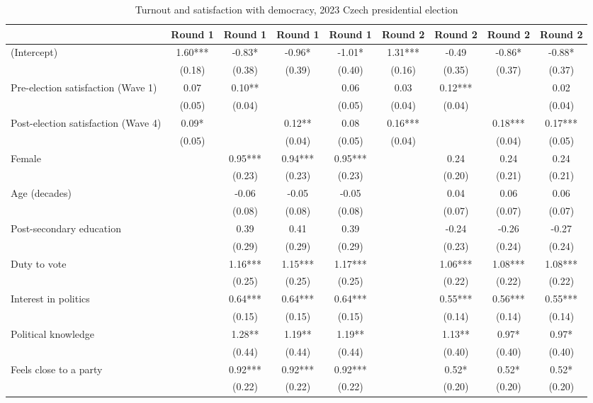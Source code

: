 \begin{table}

\caption{Turnout and satisfaction with democracy, 2023 Czech presidential election}
\centering
\begin{tabular}[t]{lcccccccc}
\toprule
  & Round 1 & Round 1  & Round 1   & Round 1    & Round 2 & Round 2  & Round 2   & Round 2   \\
\midrule
(Intercept) & 1.60*** & -0.83* & -0.96* & -1.01* & 1.31*** & -0.49 & -0.86* & -0.88*\\
 & (0.18) & (0.38) & (0.39) & (0.40) & (0.16) & (0.35) & (0.37) & (0.37)\\
Pre-election satisfaction (Wave 1) & 0.07 & 0.10** &  & 0.06 & 0.03 & 0.12*** &  & 0.02\\
 & (0.05) & (0.04) &  & (0.05) & (0.04) & (0.04) &  & (0.04)\\
Post-election satisfaction (Wave 4) & 0.09* &  & 0.12** & 0.08 & 0.16*** &  & 0.18*** & 0.17***\\
 & (0.05) &  & (0.04) & (0.05) & (0.04) &  & (0.04) & (0.05)\\
Female &  & 0.95*** & 0.94*** & 0.95*** &  & 0.24 & 0.24 & 0.24\\
 &  & (0.23) & (0.23) & (0.23) &  & (0.20) & (0.21) & (0.21)\\
Age (decades) &  & -0.06 & -0.05 & -0.05 &  & 0.04 & 0.06 & 0.06\\
 &  & (0.08) & (0.08) & (0.08) &  & (0.07) & (0.07) & (0.07)\\
Post-secondary education &  & 0.39 & 0.41 & 0.39 &  & -0.24 & -0.26 & -0.27\\
 &  & (0.29) & (0.29) & (0.29) &  & (0.23) & (0.24) & (0.24)\\
Duty to vote &  & 1.16*** & 1.15*** & 1.17*** &  & 1.06*** & 1.08*** & 1.08***\\
 &  & (0.25) & (0.25) & (0.25) &  & (0.22) & (0.22) & (0.22)\\
Interest in politics &  & 0.64*** & 0.64*** & 0.64*** &  & 0.55*** & 0.56*** & 0.55***\\
 &  & (0.15) & (0.15) & (0.15) &  & (0.14) & (0.14) & (0.14)\\
Political knowledge &  & 1.28** & 1.19** & 1.19** &  & 1.13** & 0.97* & 0.97*\\
 &  & (0.44) & (0.44) & (0.44) &  & (0.40) & (0.40) & (0.40)\\
Feels close to a party &  & 0.92*** & 0.92*** & 0.92*** &  & 0.52* & 0.52* & 0.52*\\
 &  & (0.22) & (0.22) & (0.22) &  & (0.20) & (0.20) & (0.20)\\

\end{tabular}
\end{table}
